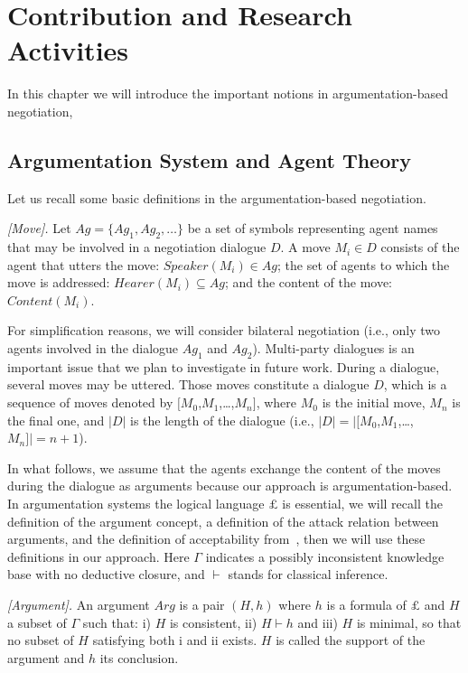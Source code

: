 \setcounter{chapter}{3}
\chapter{Contribution and Research Activities}

In this chapter we will introduce the important notions in argumentation-based negotiation,  
\section{Argumentation System and Agent Theory}\label{sec:Argumentation}
Let us recall some basic definitions in the argumentation-based negotiation.

\begin{definition}{\emph{[Move].}} \label{Move}
Let $Ag = \{Ag_1,Ag_2, \ldots\}$ be a set of symbols representing agent names that may be involved in a negotiation dialogue $D$. A
move $M_i\in D$ consists of the agent that utters the move: $Speaker(M_i)\in Ag$; the set of agents to which the move is
addressed: $Hearer(M_i)\subseteq Ag$; and the content of the move: $Content(M_i)$.
\end{definition}

For simplification reasons, we will consider bilateral negotiation (i.e., only two agents involved in the dialogue $Ag_1$ and $Ag_2$).
Multi-party dialogues is an important issue that we plan to investigate in future work. During a dialogue, several moves may be uttered.
Those moves constitute a dialogue $D$, which is a sequence of moves denoted by $[M_0$,$M_1$,\ldots,$M_n]$, where $M_0$ is the initial move,
$M_n$ is the final one, and $|D|$ is the length of the dialogue (i.e., $|D| = |[M_0$,$M_1$,\ldots,$M_n]| = n+1$).

In what follows, we assume that the agents exchange the content of the moves during the dialogue as arguments because our approach is
argumentation-based. In argumentation systems the logical language $\pounds$ is essential, we will recall the definition of the
argument concept, a definition of the attack relation between arguments, and the definition of acceptability
from~\cite{Amgoud00}, then we will use these definitions in our approach. Here $\Gamma$ indicates a possibly inconsistent
knowledge base with no deductive closure, and $\vdash$ stands for classical inference.

\begin{definition}{\emph{[Argument].}} \label{Argument}
An argument $Arg$ is a pair $(H, h)$ where $h$ is a formula of $\pounds$ and $H$ a subset of  $\Gamma$ such that: i) $H$ is
consistent, ii) $H \vdash h$ and iii) $H$ is minimal, so that no subset of $H$ satisfying both i and ii exists. $H$ is called the
support of the argument and $h$ its conclusion.
\end{definition}


